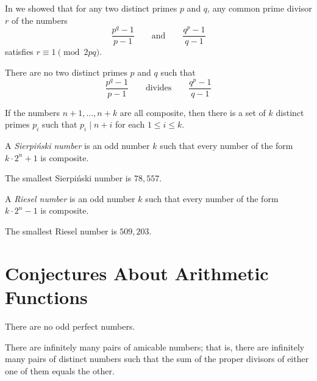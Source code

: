 In  we showed that for any two distinct primes $p$ and $q$, any common prime divisor $r$ of the numbers
\begin{equation*}
  \frac{p^q-1}{p-1} \qquad\text{and}\qquad \frac{q^p-1}{q-1}
\end{equation*}
satisfies $r\equiv 1\pmod{2pq}$.
  
\begin{conjecture}
  There are no two distinct primes $p$ and $q$ such that
  \begin{equation*}
    \frac{p^q-1}{p-1} \qquad\text{divides}\qquad \frac{q^p-1}{q-1}
  \end{equation*}
\end{conjecture}

\begin{conjecture}
  If the numbers $n+1,\ldots,n+k$ are all composite, then there is a set of $k$ distinct primes $p_i$ such that $p_i\mid n+i$ for each $1\leq i\leq k$.
\end{conjecture}

A \emph{Sierpi\'{n}ski number} is an odd number $k$ such that every number of the form $k\cdot 2^n+1$ is composite.

\begin{conjecture}
  The smallest Sierpi\'nski number is $78,557$.
\end{conjecture}

A \emph{Riesel number} is an odd number $k$ such that every number of the form $k\cdot 2^n-1$ is composite.

\begin{conjecture}
  The smallest Riesel number is $509,203$.
\end{conjecture}

\section{Conjectures About Arithmetic Functions}

\begin{conjecture}
  There are no odd perfect numbers.
\end{conjecture}

\begin{conjecture}
  There are infinitely many pairs of amicable numbers; that is, there are infinitely many pairs of distinct numbers such that the sum of the proper divisors of either one of them equals the other.
\end{conjecture}

